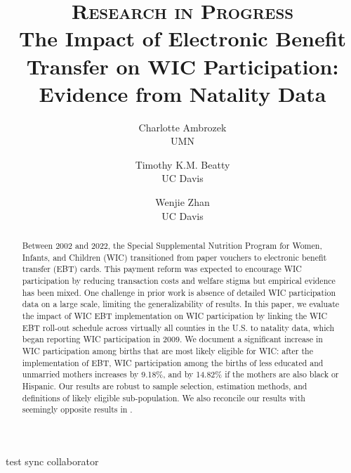 \documentclass[a4paper,twoside,11pt]{article}
\begin{document}
\title{\vspace{0.8\baselineskip} 
\textsc{Research in Progress} \\ The Impact of Electronic Benefit Transfer on WIC Participation: Evidence from Natality Data}
\author{Charlotte Ambrozek \\ UMN \and Timothy K.M. Beatty \\ UC Davis \and Wenjie Zhan \\ UC Davis}
\maketitle

\begin{abstract}
Between 2002 and 2022, the Special Supplemental Nutrition Program for Women, Infants, and Children
(WIC) transitioned from paper vouchers to electronic benefit transfer (EBT) cards. This payment reform
was expected to encourage WIC participation by reducing transaction costs and welfare stigma but empirical evidence has been mixed. One challenge in prior work is absence of detailed WIC participation data on a large scale, limiting
the generalizability of results. In this paper, we evaluate the impact of WIC EBT implementation on WIC
participation by linking the WIC EBT roll-out schedule across virtually all counties in the U.S. to natality
data, which began reporting WIC participation in 2009. We document a significant increase in WIC participation among births that are most likely eligible for WIC: after the implementation of EBT, WIC participation among the births of less educated and unmarried mothers increases by 9.18\%, and by 14.82\% if the mothers are also black or Hispanic. Our results are robust to sample selection, estimation methods, and definitions of likely eligible sub-population. We also reconcile our results with seemingly opposite results in \cite{meckel2020cure}.
\end{abstract}

\clearpage








test sync collaborator

\clearpage

\begin{spacing}{1.25}
\newpage


\end{spacing}
\end{document}
